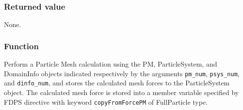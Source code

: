 \subsubsection*{Returned value}
None.

\subsubsection*{Function}
Perform a Particle Mesh calculation using the PM, ParticleSystem, and DomainInfo objects indicated respectively by the arguments \texttt{pm\_num}, \texttt{psys\_num}, and \texttt{dinfo\_num}, and stores the calculated mesh forces to the ParticleSystem object. The calculated mesh force is stored into a member variable specified by FDPS directive with keyword \texttt{copyFromForcePM} of FullParticle type.
\clearpage

